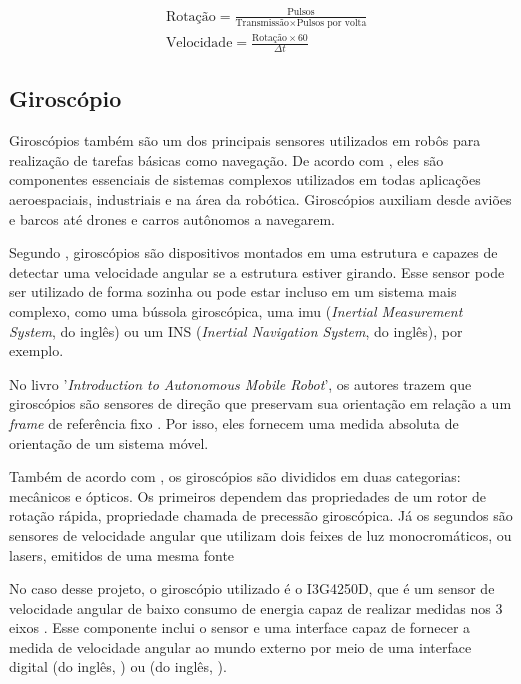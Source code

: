 \documentclass[acronym, symbols, table, deposito]{fei}
\begin{document}
				\begin{equation}\label{eq:velocidade_roda_encoder}
					\begin{split}
						&\text{Rotação} = \frac{\text{Pulsos}}{\text{Transmissão} \times \text{Pulsos por volta}} \\
						&\text{Velocidade} = \frac{\text{Rotação} \times 60}{\Delta t}
					\end{split}
				\end{equation}
			
			\subsection{Giroscópio} \label{sec:sensores_giroscopio}
			
				Giroscópios também são um dos principais sensores utilizados em robôs para realização de tarefas básicas como navegação. De acordo com \textcite{jeremydingman2020}, eles são componentes essenciais de sistemas complexos utilizados em todas aplicações aeroespaciais, industriais e na área da robótica. Giroscópios auxiliam desde aviões e barcos até drones e carros autônomos a navegarem.
				
				Segundo \textcite{s17102284}, giroscópios são dispositivos montados em uma estrutura e capazes de detectar uma velocidade angular se a estrutura estiver girando. Esse sensor pode ser utilizado de forma sozinha ou pode estar incluso em um sistema mais complexo, como uma bússola giroscópica, uma \acrshort{imu} (\textit{Inertial Measurement System}, do inglês) ou um INS (\textit{Inertial Navigation System}, do inglês), por exemplo.
				
				No livro '\textit{Introduction to Autonomous Mobile Robot}', os autores trazem que giroscópios são sensores de direção que preservam sua orientação em relação a um \textit{frame} de referência fixo \cite{siegwart2011introduction}. Por isso, eles fornecem uma medida absoluta de orientação de um sistema móvel. 
				
				Também de acordo com \textcite{siegwart2011introduction}, os giroscópios são divididos em duas categorias: mecânicos e ópticos. Os primeiros dependem das propriedades de um rotor de rotação rápida, propriedade chamada de precessão giroscópica. Já os segundos são sensores de velocidade angular que utilizam dois feixes de luz monocromáticos, ou lasers, emitidos de uma mesma fonte
				
				No caso desse projeto, o giroscópio utilizado é o I3G4250D, que é um sensor de velocidade angular de baixo consumo de energia capaz de realizar medidas nos 3 eixos \cite{datasheet_gyro}. Esse componente inclui o sensor e uma interface capaz de fornecer a medida de velocidade angular ao mundo externo por meio de uma interface digital  (do inglês, ) ou  (do inglês, ).
			
\end{document}
